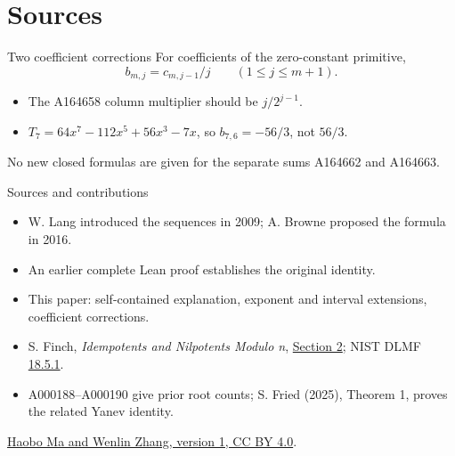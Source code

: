 \documentclass{beamer}
\begin{document}
\section{Sources}
\begin{frame}{Two coefficient corrections}
For coefficients of the zero-constant primitive,
\[
b_{m,j}=c_{m,j-1}/j\qquad(1\le j\le m+1).
\]
\begin{itemize}
\item The A164658 column multiplier should be $j/2^{j-1}$.
\item $T_7=64x^7-112x^5+56x^3-7x$, so $b_{7,6}=-56/3$, not $56/3$.
\end{itemize}
No new closed formulas are given for the separate sums A164662 and A164663.
\end{frame}
\begin{frame}{Sources and contributions}
\small
\begin{itemize}
\item W. Lang introduced the sequences in 2009; A. Browne proposed the formula in 2016.
\item An earlier complete Lean proof establishes the original identity.
\item This paper: self-contained explanation, exponent and interval extensions, coefficient corrections.
\item S. Finch, \emph{Idempotents and Nilpotents Modulo n}, \href{https://arxiv.org/abs/math/0605019v2}{Section 2}; NIST DLMF \href{https://dlmf.nist.gov/18.5.E1}{18.5.1}.
\item A000188--A000190 give prior root counts; S. Fried (2025), Theorem 1, proves the related Yanev identity.
\end{itemize}
\href{https://doi.org/10.5281/zenodo.23884883}{Haobo Ma and Wenlin Zhang, version 1, CC BY 4.0}.
\end{frame}
\end{document}
